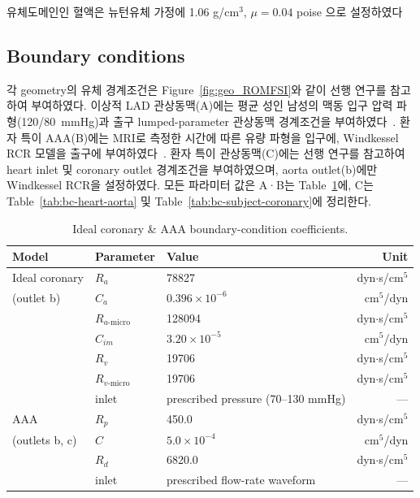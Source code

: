 \documentclass[master,english,final]{kaist-ucs}
\begin{document}
유체도메인인 혈액은 뉴턴유체 가정에 1.06 g/cm$^3$, $\mu=0.04$ poise 으로 설정하였다~\cite{fluid_newtonian_blood}

\subsection{Boundary conditions}
각 geometry의 유체 경계조건은 Figure~\ref{fig:geo_ROMFSI}와 같이 선행 연구를 참고하여 부여하였다. 이상적 LAD 관상동맥(A)에는 평균 성인 남성의 맥동 입구 압력 파형(120/80~mmHg)과 출구 lumped-parameter 관상동맥 경계조건을 부여하였다~\cite{average_pressure, coronaryBC}. 환자 특이 AAA(B)에는 MRI로 측정한 시간에 따른 유량 파형을 입구에, Windkessel RCR 모델을 출구에 부여하였다~\cite{AAA_flowrate, AAA_RCR}. 환자 특이 관상동맥(C)에는 선행 연구를 참고하여 heart inlet 및 coronary outlet 경계조건을 부여하였으며, aorta outlet(b)에만 Windkessel RCR을 설정하였다. 모든 파라미터 값은 A·B는 Table~\ref{tab:bc-ideal-aaa}에, C는 Table~\ref{tab:bc-heart-aorta} 및 Table~\ref{tab:bc-subject-coronary}에 정리한다. 

\begin{table}[ht]
\caption[Ideal coronary and AAA boundary conditions]{Ideal coronary \& AAA boundary-condition coefficients.}
\label{tab:bc-ideal-aaa}
\begin{center}
\begin{tabular}{lllr}
\hline\hline
Model & Parameter & Value & Unit \\
\hline
Ideal coronary & $R_a$ & 78827 & dyn$\cdot$s/cm$^5$ \\
(outlet b) & $C_a$ & $0.396\times10^{-6}$ & cm$^5$/dyn \\
& $R_{a\text{-micro}}$ & 128094 & dyn$\cdot$s/cm$^5$ \\
& $C_{im}$ & $3.20\times10^{-5}$ & cm$^5$/dyn \\
& $R_v$ & 19706 & dyn$\cdot$s/cm$^5$ \\
& $R_{v\text{-micro}}$ & 19706 & dyn$\cdot$s/cm$^5$ \\
& inlet & prescribed pressure (70--130 mmHg) & --- \\
AAA & $R_p$ & 450.0 & dyn$\cdot$s/cm$^5$ \\
(outlets b, c) & $C$ & $5.0\times10^{-4}$ & cm$^5$/dyn \\
& $R_d$ & 6820.0 & dyn$\cdot$s/cm$^5$ \\
& inlet & prescribed flow-rate waveform & --- \\
\hline\hline
\end{tabular}
\end{center}
\end{table}
\end{document}
